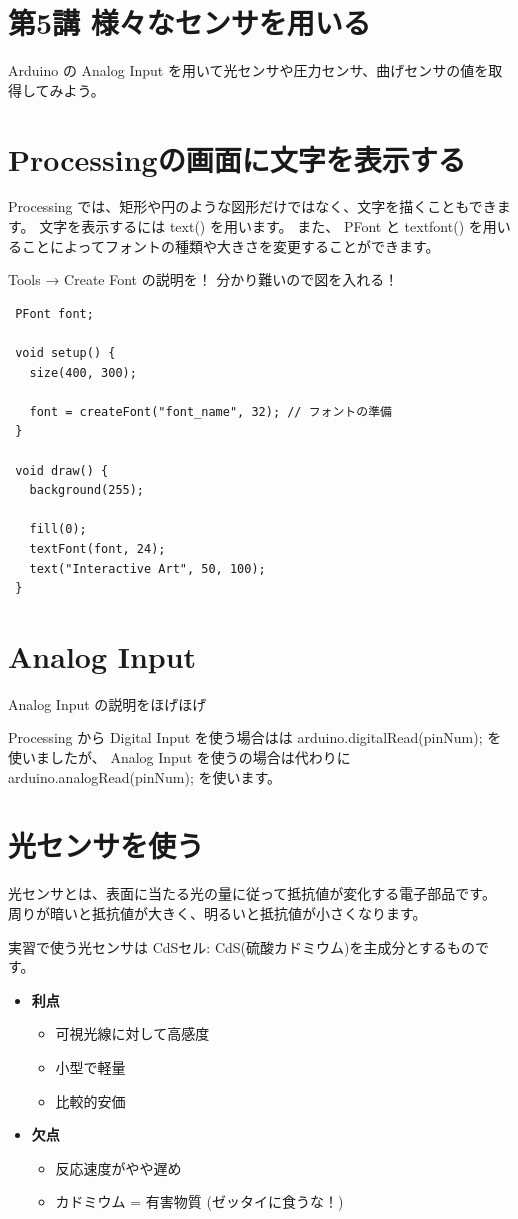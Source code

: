 \documentclass[11pt,a4paper]{jarticle}
\begin{document}
\section*{\LARGE{第5講 様々なセンサを用いる}}
Arduino の Analog Input を用いて光センサや圧力センサ、曲げセンサの値を取得してみよう。


\section{Processingの画面に文字を表示する}
Processing では、矩形や円のような図形だけではなく、文字を描くこともできます。
文字を表示するには text() を用います。
また、 PFont と textfont() を用いることによってフォントの種類や大きさを変更することができます。

Tools → Create Font の説明を！
分かり難いので図を入れる！

\begin{lstlisting}
 PFont font;

 void setup() {
   size(400, 300);
 
   font = createFont("font_name", 32); // フォントの準備
 }

 void draw() {
   background(255);

   fill(0);
   textFont(font, 24);
   text("Interactive Art", 50, 100);
 }
\end{lstlisting}


\section{Analog Input}
Analog Input の説明をほげほげ

Processing から Digital Input を使う場合はは arduino.digitalRead(pinNum); を使いましたが、
Analog Input を使うの場合は代わりに arduino.analogRead(pinNum); を使います。


\section{光センサを使う}
光センサとは、表面に当たる光の量に従って抵抗値が変化する電子部品です。
周りが暗いと抵抗値が大きく、明るいと抵抗値が小さくなります。

実習で使う光センサは CdSセル: CdS(硫酸カドミウム)を主成分とするものです。

\begin{itemize}
 \item \textbf{利点}
       \begin{itemize}
	\item 可視光線に対して高感度
	\item 小型で軽量
	\item 比較的安価
       \end{itemize}
 \item \textbf{欠点}
       \begin{itemize}
	\item 反応速度がやや遅め
	\item カドミウム = 有害物質 (ゼッタイに食うな！)
       \end{itemize}
\end{itemize}
\end{document}
